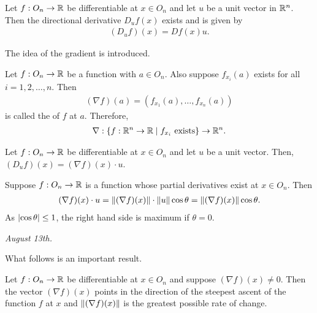 \begin{theorem}
    Let $f:O_{n} \to \mathbb{R}$ be differentiable at $x \in O_{n}$ and let $u$ be a unit vector in $\mathbb{R}^{n}$. Then the directional derivative $D_{u}f(x)$ exists and is given by
    \begin{align}
        (D_{u}f)(x) = Df(x)u.
    \end{align}
\end{theorem}

The idea of the gradient is introduced.

\begin{definition}
    Let $f:O_{n} \to \mathbb{R}$ be a function with $a \in O_{n}$. Also suppose $f_{x_{i}}(a)$ exists for all $i = 1,2,\ldots,n$. Then
    \begin{align}
        (\nabla f)(a) = (f_{x_{1}}(a),\ldots,f_{x_{n}}(a))
    \end{align}
    is called the  of $f$ at $a$. Therefore,
    \begin{align}
        \nabla:\{f:\mathbb{R}^{n}\to\mathbb{R} \mid f_{x_{i}} \text{ exists}\} \to \mathbb{R}^{n}.
    \end{align}
\end{definition}

\begin{corollary}
    Let $f:O_{n} \to \mathbb{R}$ be differentiable at $x \in O_{n}$ and let $u$ be a unit vector. Then, $(D_{u}f)(x) = (\nabla f)(x) \cdot u$.
\end{corollary}

\begin{remark}
    Suppose $f:O_{n} \to \mathbb{R}$ is a function whose partial derivatives exist at $x \in O_{n}$. Then
    \begin{align}
        (\nabla f)(x) \cdot u = \left\lVert(\nabla f)(x)\right\rVert \cdot \left\lVert u\right\rVert \cos \theta = \left\lVert(\nabla f)(x)\right\rVert \cos \theta.
    \end{align}
    As $\left| \cos \theta \right| \leq 1$, the right hand side is maximum if $\theta = 0$.
\end{remark}

\noindent \textit{August 13th.}

What follows is an important result.

\begin{theorem}
    Let $f:O_{n} \to \mathbb{R}$ be differentiable at $x \in O_{n}$ and suppose $(\nabla f)(x) \neq 0$. Then the vector $(\nabla f)(x)$ points in the direction of the steepest ascent of the function $f$ at $x$ and $\left\lVert(\nabla f)(x)\right\rVert$ is the greatest possible rate of change.
\end{theorem}


